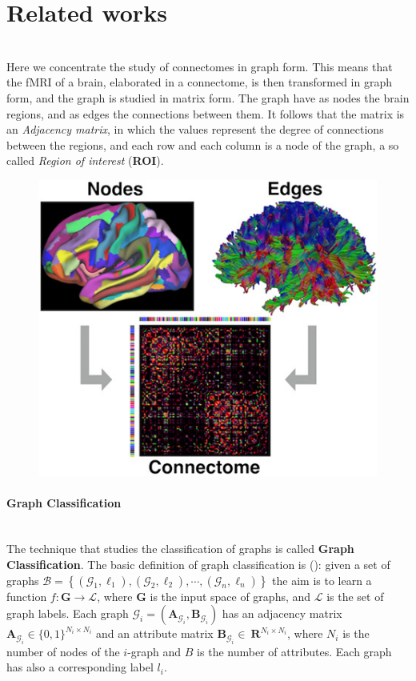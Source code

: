 \section{Related works}\
\\
Here we concentrate the study of connectomes in graph form. This means that the fMRI of a brain, elaborated in a connectome, is then transformed in graph form, and the graph is studied in matrix form. The graph have as nodes the brain regions, and as edges the connections between them. It follows that the matrix is an \emph{Adjacency matrix}, in which the values represent the degree of connections between the regions, and each row and each column is a node of the graph, a so called \emph{Region of interest} (\textbf{ROI}).
\begin{figure}[htbp]
	\centering
	\includegraphics[scale=1]{Immagini/nbm3752-toc-0001-m.jpg}
	\caption{\label{fig:diagram4}}
\end{figure}

\paragraph{Graph Classification}\
\\
The technique that studies the classification of graphs is called \textbf{Graph Classification}. The basic definition of graph classification is (\cite{GraphClassAtt}): given a set of graphs $\mathcal{B}=\left\{\left(\mathcal{G}_{1}, \ell_{1}\right),\left(\mathcal{G}_{2}, \ell_{2}\right), \cdots,\left(\mathcal{G}_{n}, \ell_{n}\right)\right\}$ the aim is to learn a function $f: \mathbf{G} \rightarrow \mathcal{L}$, where $\mathbf{G}$ is the input space of graphs, and $\mathcal{L}$ is the set of graph labels. Each graph $\mathcal{G}_{i}=\left(\mathbf{A}_{\mathcal{G}_{i}}, \mathbf{B}_{\mathcal{G}_{i}}\right)$ has an adjacency matrix $\mathbf{A}_{\mathcal{G}_{i}} \in\{0,1\}^{N_{i} \times N_{i}}$ and an attribute matrix $\mathbf{B}_{\mathcal{G}_{i}} \in\ \mathbf{R}^{N_{i} \times N_{i}}$, where ${N}_{i}$ is the number of nodes of the $i$-graph and $B$ is the number of attributes. Each graph has also a corresponding label $l_{i}$. 	


